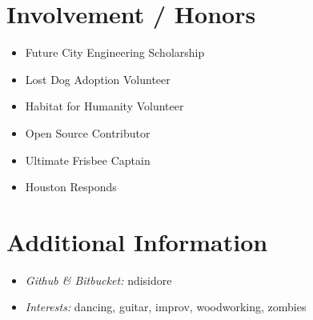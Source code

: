 \documentclass[10pt]{article}
\begin{document}
\section*{Involvement / Honors}
\begin{multicols}{3}
  \begin{itemize}
    \item Future City Engineering Scholarship
    \item Lost Dog Adoption Volunteer
    \item Habitat for Humanity Volunteer
    \item Open Source Contributor
    \item Ultimate Frisbee Captain
    \item Houston Responds
  \end{itemize}
\end{multicols}

\enlargethispage{3\baselineskip}

\section*{Additional Information}
\begin{multicols}{2}
  \begin{itemize}
    \item \textit{Github \& Bitbucket:} ndisidore
    \item \textit{Interests:} dancing, guitar, improv, woodworking, zombies
  \end{itemize}
\end{multicols}
\end{document}

